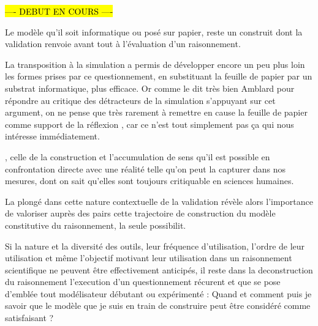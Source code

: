 \hl{ ---- DEBUT EN COURS ---- }

Le modèle qu'il soit informatique ou posé sur papier, reste un construit dont la validation renvoie avant tout à l'évaluation d'un raisonnement. 


La transposition à la simulation a permis de développer encore un peu plus loin les formes prises par ce questionnement, en substituant la feuille de papier par un substrat informatique, plus efficace. Or comme le dit très bien Amblard pour répondre au critique des détracteurs de la simulation s'appuyant sur cet argument, on ne pense que très rarement à remettre en cause la feuille de papier comme support de la réflexion , car ce n'est tout simplement pas ça qui nous intéresse immédiatement. 

, celle de la construction et l'accumulation de sens qu'il est possible en confrontation directe avec une réalité telle qu'on peut la capturer dans nos mesures, dont on sait qu'elles sont toujours critiquable en sciences humaines. 

La plongé dans cette nature contextuelle de la validation révèle alors l'importance de valoriser auprès des pairs cette trajectoire de construction du modèle constitutive du raisonnement, la seule possibilit.

Si la nature et la diversité des outils, leur fréquence d'utilisation, l'ordre de leur utilisation et même l'objectif motivant leur utilisation dans un raisonnement scientifique ne peuvent être effectivement anticipés, il reste dans la deconstruction du raisonnement l'execution d'un questionnement récurent et que se pose d'emblée tout modélisateur débutant ou expérimenté : Quand et comment puis je savoir que le modèle que je suis en train de construire peut être considéré comme satisfaisant ?


